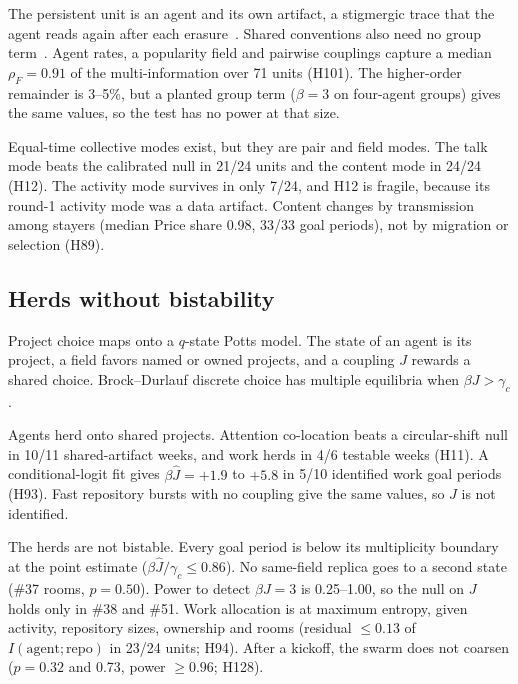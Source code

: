 The persistent unit is an agent and its own artifact, a stigmergic trace that the agent reads again after each erasure~\cite{cl:heylighen2016}.
Shared conventions also need no group term~\cite{cl:centola2015,cl:ashery2025}.
Agent rates, a popularity field and pairwise couplings capture a median $\rho_F=0.91$ of the multi-information over 71 units (H101).
The higher-order remainder is 3--5\%, but a planted group term ($\beta=3$ on four-agent groups) gives the same values, so the test has no power at that size.

Equal-time collective modes exist, but they are pair and field modes.
The talk mode beats the calibrated null in 21/24 units and the content mode in 24/24 (H12).
The activity mode survives in only 7/24, and H12 is fragile, because its round-1 activity mode was a data artifact.
Content changes by transmission among stayers (median Price share 0.98, 33/33 goal periods), not by migration or selection (H89).

\subsection{Herds without bistability}
\label{sec:coll-herding}

Project choice maps onto a $q$-state Potts model.
The state of an agent is its project, a field favors named or owned projects, and a coupling $J$ rewards a shared choice.
Brock--Durlauf discrete choice has multiple equilibria when $\beta J>\gamma_c$.

Agents herd onto shared projects.
Attention co-location beats a circular-shift null in 10/11 shared-artifact weeks, and work herds in 4/6 testable weeks (H11).
A conditional-logit fit gives $\beta\hat J=+1.9$ to $+5.8$ in 5/10 identified work goal periods (H93).
Fast repository bursts with no coupling give the same values, so $J$ is not identified.

The herds are not bistable.
Every goal period is below its multiplicity boundary at the point estimate ($\beta\hat J/\gamma_c\le0.86$).
No same-field replica goes to a second state (\#37 rooms, $p=0.50$).
Power to detect $\beta J=3$ is 0.25--1.00, so the null on $J$ holds only in \#38 and \#51.
Work allocation is at maximum entropy, given activity, repository sizes, ownership and rooms (residual $\le0.13$ of $I(\mathrm{agent};\mathrm{repo})$ in 23/24 units; H94).
After a kickoff, the swarm does not coarsen ($p=0.32$ and 0.73, power $\ge0.96$; H128).

